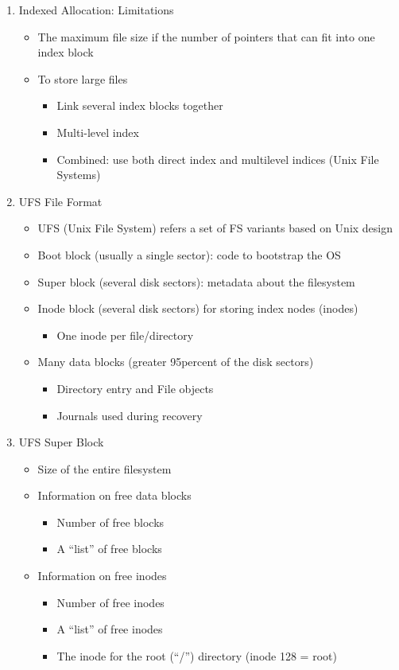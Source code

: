 \documentclass[11pt]{article}
\begin{document}
\begin{enumerate}
\item Indexed Allocation: Limitations
	\begin{itemize}
  	\item The maximum file size if the number of pointers that can fit into one index block
  	\item To store large files
		\begin{itemize}
  		\item Link several index blocks together
  		\item Multi-level index
  		\item Combined: use both direct index and multilevel indices (Unix File Systems)
		\end{itemize}  
	\end{itemize}
	
\item UFS File Format
	\begin{itemize}
  	\item UFS (Unix File System) refers a set of FS variants based on Unix design
  	\item Boot block (usually a single sector): code to bootstrap the OS
  	\item Super block (several disk sectors): metadata about the filesystem
  	\item Inode block (several disk sectors) for storing index nodes (inodes)
  		\begin{itemize}
  		\item One inode per file/directory
  		\end{itemize}
  	\item Many data blocks (greater 95percent of the disk sectors)
  		\begin{itemize}
  		\item Directory entry and File objects
  		\item Journals used during recovery
  		\end{itemize}
	\end{itemize}
	
\item UFS Super Block
	\begin{itemize}
	\item Size of the entire filesystem
	\item Information on free data blocks
		\begin{itemize}
		\item Number of free blocks
		\item A “list” of free blocks
		\end{itemize}
	\item Information on free inodes
		\begin{itemize}
		\item Number of free inodes
		\item A “list” of free inodes
		\item The inode for the root (“/”) directory (inode 128 = root)
		\end{itemize}
	\end{itemize}
	

\end{enumerate}
\end{document}
